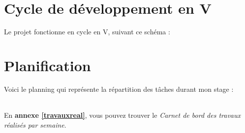 \section{Cycle de développement en V}
Le projet fonctionne en cycle en V, suivant ce schéma :\\
\noindent%
\begin{minipage}{\linewidth}%
\label{visina8}%
\end{minipage}
\newpage
\section{Planification}
Voici le planning qui représente la répartition des tâches durant mon stage :\\\\
\noindent%
\begin{minipage}{\linewidth}%
\label{visina8}%
\end{minipage}

En \textbf{annexe \ref{travauxreal}}, vous pouvez trouver le \textit{Carnet de bord des travaux réalisés par semaine}.
